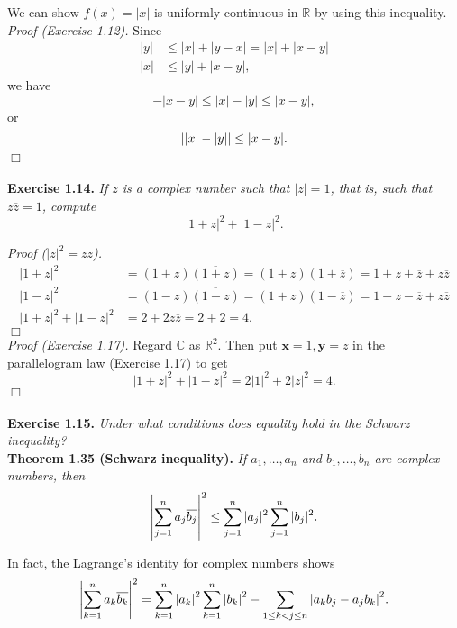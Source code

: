 \documentclass{article}
\begin{document}
We can show $f(x) = |x|$ is uniformly continuous in $\mathbb{R}$ by using this inequality. \\

\emph{Proof (Exercise 1.12).}
Since
\begin{align*}
|y| &\leq |x| + |y-x| = |x| + |x-y| \\
|x| &\leq |y| + |x-y|,
\end{align*}
we have
$$-|x-y| \leq |x| - |y| \leq |x-y|,$$
or
$$\abs{|x| - |y|} \leq |x-y|.$$
$\Box$ \\\\






\textbf{Exercise 1.14.}
\emph{If $z$ is a complex number such that $|z|=1$, that is, such that $z\overline{z}=1$,
compute
$$|1+z|^2+|1-z|^2.$$}

\emph{Proof ($|z|^2 = z\overline{z}$).}
\begin{align*}
|1+z|^2 &= (1+z)\overline{(1+z)} = (1+z)(1+\overline{z}) = 1+z+\overline{z}+z\overline{z} \\
|1-z|^2 &= (1-z)\overline{(1-z)} = (1+z)(1-\overline{z}) = 1-z-\overline{z}+z\overline{z} \\
|1+z|^2+|1-z|^2 &= 2+2z\overline{z} = 2+2 = 4.
\end{align*}
$\Box$ \\

\emph{Proof (Exercise 1.17).}
Regard $\mathbb{C}$ as $\mathbb{R}^2$.
Then put $\mathbf{x} = 1, \mathbf{y} = z$ in the parallelogram law (Exercise 1.17)
to get $$|1+z|^2+|1-z|^2 = 2|1|^2 + 2|z|^2 = 4.$$
$\Box$ \\\\






\textbf{Exercise 1.15.}
\emph{Under what conditions does equality hold in the Schwarz inequality?} \\

\textbf{Theorem 1.35 (Schwarz inequality).}
\emph{If $a_1, \ldots, a_n$ and $b_1, \ldots, b_n$ are complex numbers, then
$$\abs{\sum_{j=1}^n a_j \overline{b_j}}^2
\leq \sum_{j=1}^n |a_j|^2 \sum_{j=1}^n|b_j|^2.$$}

In fact, the Lagrange's identity for complex numbers shows
$$\abs{ \sum_{k=1}^{n} a_k \overline{b_k} }^2
= \sum_{k=1}^{n} \abs{a_k}^2 \sum_{k=1}^{n} \abs{b_k}^2
- \sum_{1 \leq k < j \leq n}
\abs{ a_k b_j - a_j b_k }^2.$$ \\
\end{document}
